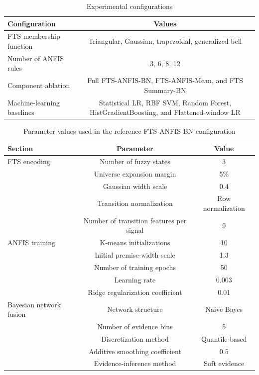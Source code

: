 \documentclass[runningheads]{llncs}
\begin{document}
\begin{table}[t]
\centering
\caption{Experimental configurations}\label{tab:2}
\small
\begin{tabular}{lc}
\hline
Configuration & Values \\
\hline
FTS membership function & Triangular, Gaussian, trapezoidal, generalized bell \\
Number of ANFIS rules & 3, 6, 8, 12 \\
Component ablation & Full FTS-ANFIS-BN, FTS-ANFIS-Mean, and FTS Summary-BN \\
Machine-learning baselines & Statistical LR, RBF SVM, Random Forest, HistGradientBoosting, and Flattened-window LR \\
\hline
\end{tabular}
\end{table}

\begin{table}[t]
\centering
\caption{Parameter values used in the reference FTS-ANFIS-BN configuration}\label{tab:3}
\small
\begin{tabular}{lcc}
\hline
Section & Parameter & Value \\
\hline
FTS encoding & Number of fuzzy states & 3 \\
 & Universe expansion margin & 5\% \\
 & Gaussian width scale & 0.4 \\
 & Transition normalization & Row normalization \\
 & Number of transition features per signal & 9 \\
ANFIS training & K-means initializations & 10 \\
 & Initial premise-width scale & 1.3 \\
 & Number of training epochs & 50 \\
 & Learning rate & 0.003 \\
 & Ridge regularization coefficient & 0.01 \\
Bayesian network fusion & Network structure & Naive Bayes \\
 & Number of evidence bins & 5 \\
 & Discretization method & Quantile-based \\
 & Additive smoothing coefficient & 0.5 \\
 & Evidence-inference method & Soft evidence \\
\hline
\end{tabular}
\end{table}
\end{document}
